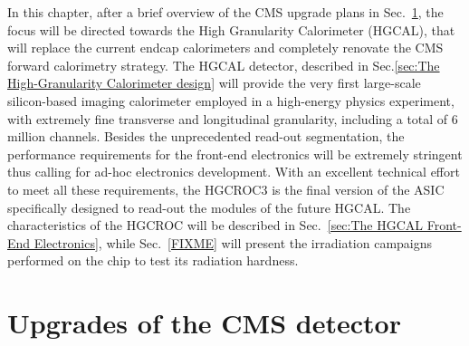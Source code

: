 \bigbreak

In this chapter, after a brief overview of the CMS upgrade plans in Sec.~\ref{sec:Upgrades of the CMS detector}, the focus will be directed towards the High Granularity Calorimeter (HGCAL), that will replace the current endcap calorimeters and completely renovate the CMS forward calorimetry strategy. The HGCAL detector, described in Sec.\ref{sec:The High-Granularity Calorimeter design} will provide the very first large-scale silicon-based imaging calorimeter employed in a high-energy physics experiment, with extremely fine transverse and longitudinal granularity, including a total of 6 million channels. Besides the unprecedented read-out segmentation, the performance requirements for the front-end electronics will be extremely stringent thus calling for ad-hoc electronics development. With an excellent technical effort to meet all these requirements, the HGCROC3 is the final version of the ASIC specifically designed to read-out the modules of the future HGCAL. 
The characteristics of the HGCROC will be described in Sec.~\ref{sec:The HGCAL Front-End Electronics}, while Sec.~\ref{FIXME} will present the irradiation campaigns performed on the chip to test its radiation hardness. 


\section{Upgrades of the CMS detector}
\label{sec:Upgrades of the CMS detector}

